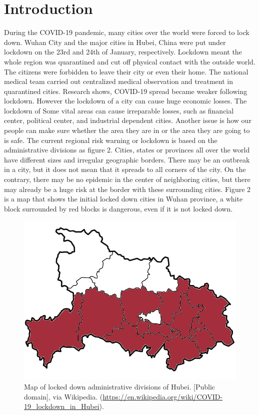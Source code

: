 \documentclass[sigplan,screen]{acmart}
\begin{document}
\maketitle
\section{Introduction}
During the COVID-19 pandemic, many cities over the world were forced to lock down.
Wuhan City and the major cities in Hubei, China were put under lockdown on the 23rd and 24th of January, respectively\cite{lau2020positive}.
Lockdown meant the whole region was quarantined and cut off physical contact with the outside world.
The citizens were forbidden to leave their city or even their home.
The national medical team carried out centralized medical observation and treatment in quarantined cities.
Research shows, COVID-19 spread became weaker following lockdown\cite{lau2020positive}.
However the lockdown of a city can cause huge economic losses.
The lockdown of Some vital areas can cause irreparable losses, such as financial center, political center, and industrial dependent cities.
Another issue is how our people can make sure whether the area they are in or the area they are going to is safe.
The current regional risk warning or lockdown is based on the administrative divisions as figure 2.
Cities, states or provinces all over the world have different sizes and irregular geographic borders.
There may be an outbreak in a city, but it does not mean that it spreads to all corners of the city.
On the contrary, there may be no epidemic in the center of neighboring cities, but there may already be a huge risk at the border with these surrounding cities.
Figure 2 is a map that shows the initial locked down cities in Wuhan province, a white block surrounded by red blocks is dangerous, even if it is not locked down.
\begin{figure}[htb]
	\centering
	\includegraphics[width=\linewidth]{hubei.png}
	\caption{Map of locked down administrative divisions of Hubei. [Public domain], via Wikipedia. (\url{https://en.wikipedia.org/wiki/COVID-19_lockdown_in_Hubei}).}
\end{figure}
\end{document}
